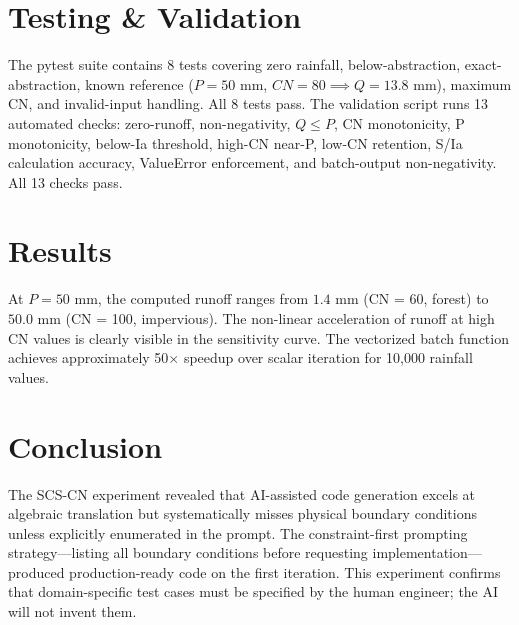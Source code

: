 \documentclass[12pt,a4paper]{article}
\begin{document}
\section{Testing \& Validation}
The pytest suite contains 8 tests covering zero rainfall, below-abstraction, exact-abstraction, known reference ($P = 50$ mm, $CN = 80 \implies Q = 13.8$ mm), maximum CN, and invalid-input handling. All 8 tests pass. The validation script runs 13 automated checks: zero-runoff, non-negativity, $Q \leq P$, CN monotonicity, P monotonicity, below-Ia threshold, high-CN near-P, low-CN retention, S/Ia calculation accuracy, ValueError enforcement, and batch-output non-negativity. All 13 checks pass.

\section{Results}
At $P = 50$ mm, the computed runoff ranges from $1.4$ mm (CN = 60, forest) to $50.0$ mm (CN = 100, impervious). The non-linear acceleration of runoff at high CN values is clearly visible in the sensitivity curve. The vectorized batch function achieves approximately 50$\times$ speedup over scalar iteration for 10,000 rainfall values.

\section{Conclusion}
The SCS-CN experiment revealed that AI-assisted code generation excels at algebraic translation but systematically misses physical boundary conditions unless explicitly enumerated in the prompt. The constraint-first prompting strategy—listing all boundary conditions before requesting implementation—produced production-ready code on the first iteration. This experiment confirms that domain-specific test cases must be specified by the human engineer; the AI will not invent them.
\end{document}
